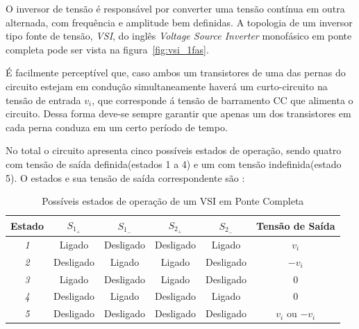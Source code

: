 \documentclass[
	12pt,				%
	openany,
	onseside,
	a4paper,			%
	english,			%
	french,				%
	spanish,			%
	brazil,				%
	]{abntex2}
\begin{document}

O inversor de tensão é responsável por converter uma tensão contínua em outra alternada, com frequência e amplitude bem definidas. A topologia de um inversor tipo fonte de tensão, \emph{VSI}, do inglês \textit{Voltage Source Inverter} monofásico em ponte completa pode ser vista na figura~\ref{fig:vsi_1fas}. 

É facilmente perceptível que, caso ambos um transistores de uma das pernas do circuito estejam em condução simultaneamente haverá um curto-circuito na tensão de entrada $v_i$, que corresponde á tensão de barramento CC que alimenta o circuito. Dessa forma deve-se sempre garantir que apenas um dos transistores em cada perna conduza em um certo período de tempo.

No total o circuito apresenta cinco possíveis estados de operação, sendo quatro com tensão de saída definida(estados 1 a 4) e um com tensão indefinida(estado 5). O estados e sua tensão de saída correspondente são \cite{RASHID_VSI}:

\begin{table}[h]%
	\centering
	\begin{tabular}{|c|c|c|c|c|c|}
	\hline
	\rowcolor[HTML]{C0C0C0} 
	\textbf{Estado} & \textbf{$S_{1_+}$} & \textbf{$S_{1_-}$} & \textbf{$S_{2_+}$} & \textbf{$S_{2_-}$} & \textbf{Tensão de Saída} \\ \hline
	\textit{1}      & Ligado             & Desligado          & Desligado          & Ligado             & $v_i$                    \\ \hline
	\textit{2}      & Desligado          & Ligado             & Ligado             & Desligado          & $-v_i$                   \\ \hline
	\textit{3}      & Ligado             & Desligado          & Ligado             & Desligado          & 0                        \\ \hline
	\textit{4}      & Desligado          & Ligado             & Desligado          & Ligado             & 0                        \\ \hline
	\textit{5}      & Desligado          & Desligado          & Desligado          & Desligado          & $v_i$ ou $-v_i$          \\ \hline
	\end{tabular}
	\caption{Possíveis estados de operação de um VSI em Ponte Completa}
	\label{table:VSI_states}
\end{table}
\end{document}

